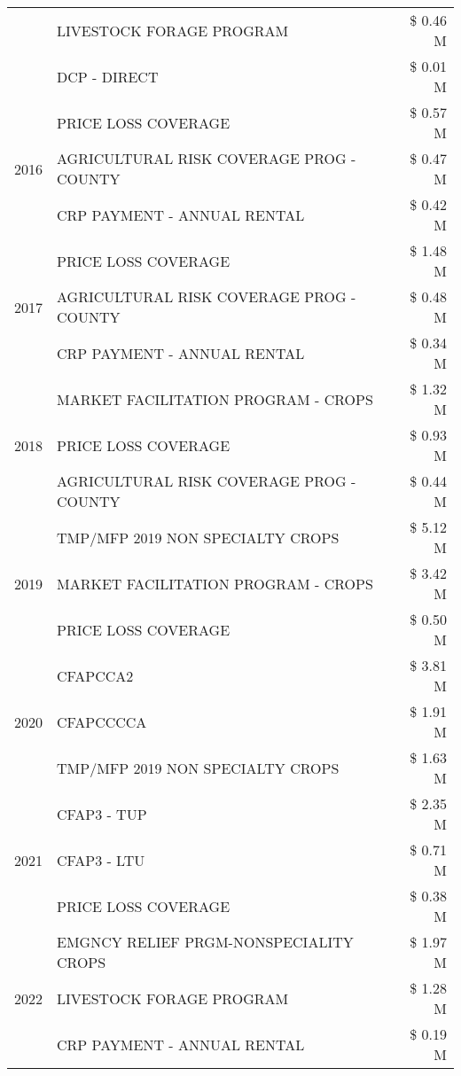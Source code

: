 \begin{tabular}{llr}
 & LIVESTOCK FORAGE PROGRAM & \$ 0.46 M \\
 & DCP - DIRECT & \$ 0.01 M \\
\cline{1-3}
\multirow[t]{3}{*}{2016} & PRICE LOSS COVERAGE & \$ 0.57 M \\
 & AGRICULTURAL RISK COVERAGE PROG - COUNTY & \$ 0.47 M \\
 & CRP PAYMENT - ANNUAL RENTAL & \$ 0.42 M \\
\cline{1-3}
\multirow[t]{3}{*}{2017} & PRICE LOSS COVERAGE & \$ 1.48 M \\
 & AGRICULTURAL RISK COVERAGE PROG - COUNTY & \$ 0.48 M \\
 & CRP PAYMENT - ANNUAL RENTAL & \$ 0.34 M \\
\cline{1-3}
\multirow[t]{3}{*}{2018} & MARKET FACILITATION PROGRAM - CROPS & \$ 1.32 M \\
 & PRICE LOSS COVERAGE & \$ 0.93 M \\
 & AGRICULTURAL RISK COVERAGE PROG - COUNTY & \$ 0.44 M \\
\cline{1-3}
\multirow[t]{3}{*}{2019} & TMP/MFP 2019 NON SPECIALTY CROPS & \$ 5.12 M \\
 & MARKET FACILITATION PROGRAM - CROPS & \$ 3.42 M \\
 & PRICE LOSS COVERAGE & \$ 0.50 M \\
\cline{1-3}
\multirow[t]{3}{*}{2020} & CFAPCCA2 & \$ 3.81 M \\
 & CFAPCCCCA & \$ 1.91 M \\
 & TMP/MFP 2019 NON SPECIALTY CROPS & \$ 1.63 M \\
\cline{1-3}
\multirow[t]{3}{*}{2021} & CFAP3 - TUP & \$ 2.35 M \\
 & CFAP3 - LTU & \$ 0.71 M \\
 & PRICE LOSS COVERAGE & \$ 0.38 M \\
\cline{1-3}
\multirow[t]{3}{*}{2022} & EMGNCY RELIEF PRGM-NONSPECIALITY CROPS & \$ 1.97 M \\
 & LIVESTOCK FORAGE PROGRAM & \$ 1.28 M \\
 & CRP PAYMENT - ANNUAL RENTAL & \$ 0.19 M \\
\cline{1-3}
\bottomrule
\end{tabular}
